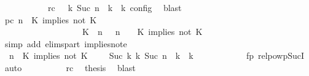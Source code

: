 \begin{isabellebody}
\ \ \ \ \ \ \ \ \ \ \ rc{\isacharcolon}{\isacartoucheopen}{\isasymrho}\ {\isasymin}\ {\isasymlbrakk}\ {\isasymGamma}\isactrlsub k{\isacharcomma}\ Suc\ n\ {\isasymturnstile}\ {\isasymPsi}\isactrlsub k\ {\isasymtriangleright}\ {\isasymPhi}\isactrlsub k\ {\isasymrbrakk}\isactrlsub c\isactrlsub o\isactrlsub n\isactrlsub f\isactrlsub i\isactrlsub g{\isacartoucheclose}\ \isamarkupfalse%
\ blast\isanewline
\ \ \ \ \ \ \ \ \isamarkupfalse%
\ pc{\isacharcolon}{\isacartoucheopen}{\isacharparenleft}{\isasymGamma}{\isacharcomma}\ n\ {\isasymturnstile}\ {\isacharparenleft}K\ implies\ not\ K\ {\isacharhash}\ {\isasymPsi}\ {\isasymtriangleright}\ {\isasymPhi}{\isacharparenright}\isanewline
\ \ \ \ \ \ \ \ \ \ \ \ \ \ \ \ \ \ {\isasymhookrightarrow}\ {\isacharparenleft}{\isacharparenleft}{\isacharparenleft}K\ {\isasymnot}{\isasymUp}\ n{\isacharparenright}\ {\isacharhash}\ {\isasymGamma}{\isacharparenright}{\isacharcomma}\ n\ {\isasymturnstile}\ {\isasymPsi}\ {\isasymtriangleright}\ {\isacharparenleft}{\isacharparenleft}K\ implies\ not\ K\ {\isacharhash}\ {\isasymPhi}{\isacharparenright}{\isacharparenright}{\isacartoucheclose}\isanewline
\ \ \ \ \ \ \ \ \ \ \isamarkupfalse%
\ {\isacharparenleft}simp\ add{\isacharcolon}\ elims{\isacharunderscore}part\ implies{\isacharunderscore}not{\isacharunderscore}e{}{\isacharparenright}\isanewline
\ \ \ \ \ \ \ \ \isamarkupfalse%
\ {\isacartoucheopen}{\isacharparenleft}{\isasymGamma}{\isacharcomma}\ n\ {\isasymturnstile}\ {\isacharparenleft}K\ implies\ not\ K\ {\isacharhash}\ {\isasymPsi}\ {\isasymtriangleright}\ {\isasymPhi}{\isacharparenright}\ {\isasymhookrightarrow}\isactrlbsup Suc\ k\isactrlesup \ {\isacharparenleft}{\isasymGamma}\isactrlsub k{\isacharcomma}\ Suc\ n\ {\isasymturnstile}\ {\isasymPsi}\isactrlsub k\ {\isasymtriangleright}\ {\isasymPhi}\isactrlsub k{\isacharparenright}{\isacartoucheclose}\isanewline
\ \ \ \ \ \ \ \ \ \ \isamarkupfalse%
\ fp\ relpowp{\isacharunderscore}Suc{\isacharunderscore}I{}\ \isamarkupfalse%
\ auto\isanewline
\ \ \ \ \ \ \ \ \isamarkupfalse%
\ rc\ \isamarkupfalse%
\ {\isacharquery}thesis\ \isamarkupfalse%
\ blast\isanewline
\ \ \ \ \ \ \isamarkupfalse%
\isanewline

\end{isabellebody}
